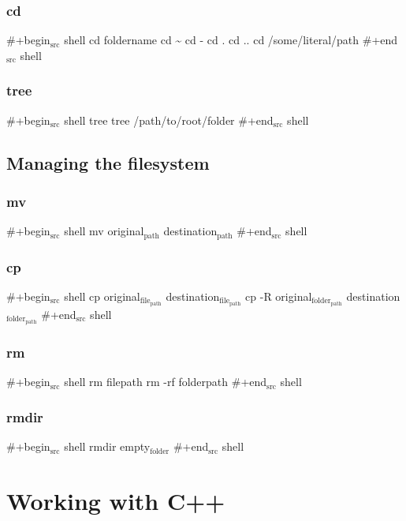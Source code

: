 \documentclass[11pt]{article}
\begin{document}
\subsubsection{cd}
\label{sec:orgheadline28}
\#+begin\(_{\text{src}}\) shell
cd foldername
cd \textasciitilde{}
cd -
cd .
cd ..
cd /some/literal/path
\#+end\(_{\text{src}}\) shell

\subsubsection{tree}
\label{sec:orgheadline29}
\#+begin\(_{\text{src}}\) shell
tree
tree /path/to/root/folder
\#+end\(_{\text{src}}\) shell


\subsection{Managing the filesystem}
\label{sec:orgheadline35}

\subsubsection{mv}
\label{sec:orgheadline31}
\#+begin\(_{\text{src}}\) shell
mv original\(_{\text{path}}\) destination\(_{\text{path}}\)
\#+end\(_{\text{src}}\) shell

\subsubsection{cp}
\label{sec:orgheadline32}
\#+begin\(_{\text{src}}\) shell
cp original\(_{\text{file}}_{\text{path}}\) destination\(_{\text{file}}_{\text{path}}\)
cp -R original\(_{\text{folder}}_{\text{path}}\) destination\(_{\text{folder}}_{\text{path}}\)
\#+end\(_{\text{src}}\) shell

\subsubsection{rm}
\label{sec:orgheadline33}
\#+begin\(_{\text{src}}\) shell
rm filepath
rm -rf folderpath
\#+end\(_{\text{src}}\) shell

\subsubsection{rmdir}
\label{sec:orgheadline34}
\#+begin\(_{\text{src}}\) shell
rmdir empty\(_{\text{folder}}\)
\#+end\(_{\text{src}}\) shell



\section{Working with C++}
\label{sec:orgheadline46}
\end{document}
